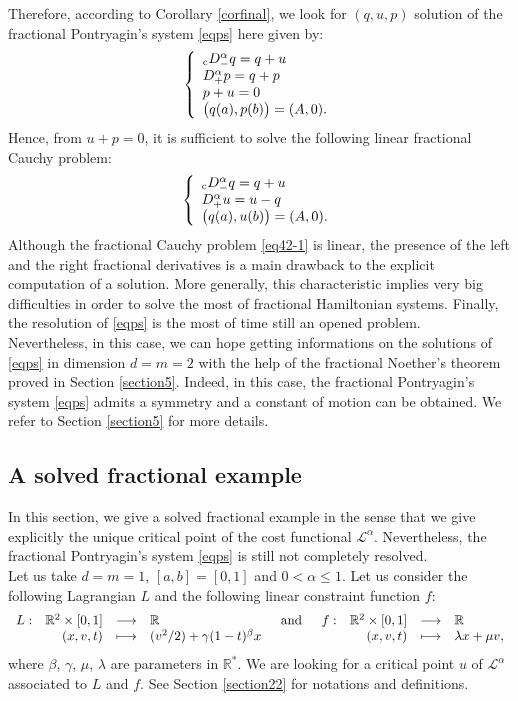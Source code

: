 \documentclass[english,11pt,reqno]{smfart}
\newcommand{\R}{\mathbb{R}}
\newcommand{\LL}{\mathcal{L}}
\newcommand{\cDM}{{}_{{\rm c}} D^\alpha_-}
\newcommand{\DP}{D^\alpha_+}
\newcommand{\fonction}[5]{\begin{array}[t]{lrcl}#1 :&#2 &\longrightarrow &#3\\&#4& \longmapsto &#5 \end{array}}
\begin{document}
Therefore, according to Corollary \ref{corfinal}, we look for $(q,u,p)$ solution of the fractional Pontryagin's system \eqref{eqps} here given by:
\begin{equation}\label{eq42-0}
 \left\lbrace \begin{array}{l}
 		\cDM q = q+u \\
 		\DP p = q+p \\
	    p+u = 0 \\
	    \big( q(a),p(b) \big) = ( A,0 ).
        \end{array}
\right.
\end{equation}
Hence, from $u+p=0$, it is sufficient to solve the following linear fractional Cauchy problem:
\begin{equation}\label{eq42-1}
 \left\lbrace \begin{array}{l}
 		\cDM q = q+u \\
 		\DP u = u-q \\
	    \big( q(a),u(b) \big) = ( A,0 ).
        \end{array}
\right.
\end{equation}
Although the fractional Cauchy problem \eqref{eq42-1} is linear, the presence of the left and the right fractional derivatives is a main drawback to the explicit computation of a solution. More generally, this characteristic implies very big difficulties in order to solve the most of fractional Hamiltonian systems. Finally, the resolution of \eqref{eqps} is the most of time still an opened problem. \\

Nevertheless, in this case, we can hope getting informations on the solutions of \eqref{eqps} in dimension $d=m=2$ with the help of the fractional Noether's theorem proved in Section \ref{section5}. Indeed, in this case, the fractional Pontryagin's system \eqref{eqps} admits a symmetry and a constant of motion can be obtained. We refer to Section \ref{section5} for more details.

\subsection{A solved fractional example}\label{section43} 
In this section, we give a solved fractional example in the sense that we give explicitly the unique critical point of the cost functional $\LL^\alpha$. Nevertheless, the fractional Pontryagin's system \eqref{eqps} is still not completely resolved. \\

Let us take $d=m=1$, $[a,b]=[0,1]$ and $0<\alpha \leq 1$. Let us consider the following Lagrangian $L$ and the following linear constraint function $f$:
\begin{equation}\label{eq43-1}
\fonction{L}{\R^2 \times [0,1]}{\R}{(x,v,t)}{(v^2/2) + \gamma (1-t)^\beta x} \quad \text{and} \quad \fonction{f}{\R^2 \times [0,1]}{\R}{(x,v,t)}{\lambda x + \mu v,}
\end{equation}
where $\beta$, $\gamma$, $\mu$, $\lambda$ are parameters in $\R^*$. We are looking for a critical point $u$ of $\LL^\alpha$ associated to $L$ and $f$. See Section \ref{section22} for notations and definitions. \\
\end{document}
